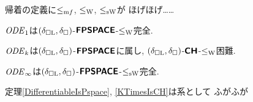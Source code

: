 帰着の定義に$\redMF$, $\redW$, $\redSW$が
ほげほげ……

\begin{theorem}
$\OpIVP _1$は$(\deltaboxLip, \deltabox)$-$\classFPSPACEtwo$-$\redW$完全. 
\end{theorem}

\begin{theorem}
$\OpIVP _k$は$(\deltaboxLip, \deltabox)$-$\classFPSPACEtwo$に属し, 
$(\deltaboxLip, \deltabox)$-$\classCHtwo$-$\redW$困難. 
\end{theorem}

\begin{theorem}
$\OpIVP _\infty$は$(\deltaboxLip, \deltabox)$-$\classFPSPACEtwo$-$\redSW$完全. 
\end{theorem}

定理\ref{DifferentiableIsPspace}, \ref{KTimesIsCH}は系として
ふがふが
